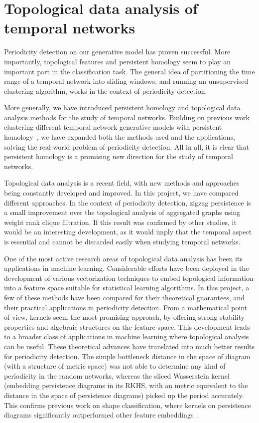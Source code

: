 \documentclass[a4paper,11pt,openany,extrafontsizes]{memoir}
\begin{document}
\section{Topological data analysis of temporal networks}%
\label{sec:topol-data-analys}

Periodicity detection on our generative model has proven
successful. More importantly, topological features and persistent
homology seem to play an important part in the classification
task. The general idea of partitioning the time range of a temporal
network into sliding windows, and running an unsupervised clustering
algorithm, works in the context of periodicity detection.

More generally, we have introduced persistent homology and topological
data analysis methods for the study of temporal networks. Building on
previous work clustering different temporal network generative models
with persistent homology~\cite{price-wright_topological_2015}, we have
expanded both the methods used and the applications, solving the
real-world problem of periodicity detection. All in all, it is clear
that persistent homology is a promising new direction for the study of
temporal networks.

Topological data analysis is a recent field, with new methods and
approaches being constantly developed and improved. In this project,
we have compared different approaches. In the context of periodicity
detection, zigzag persistence is a small improvement over the
topological analysis of aggregated graphs using weight rank clique
filtration. If this result was confirmed by other studies, it would be
an interesting development, as it would imply that the temporal aspect
is essential and cannot be discarded easily when studying temporal
networks.

One of the most active research areas of topological data analysis has
been its applications in machine learning. Considerable efforts have
been deployed in the development of various vectorization techniques
to embed topological information into a feature space suitable for
statistical learning algorithms. In this project, a few of these
methods have been compared for their theoretical guarantees, and their
practical applications in periodicity detection. From a mathematical
point of view, kernels seem the most promising approach, by offering
strong stability properties and algebraic structures on the feature
space. This development leads to a broader class of applications in
machine learning where topological analysis can be useful. These
theoretical advances have translated into much better results for
periodicity detection. The simple bottleneck distance in the space of
diagram (with a structure of metric space) was not able to determine
any kind of periodicity in the random networks, whereas the sliced
Wasserstein kernel (embedding persistence diagrams in its RKHS, with
an metric equivalent to the distance in the space of persistence
diagrams) picked up the period accurately. This confirms previous work
on shape classification, where kernels on persistence diagrams
significantly outperformed other feature
embeddings~\cite{kusano_kernel_2017, reininghaus_stable_2015,
  carriere_sliced_2017}.
\end{document}
